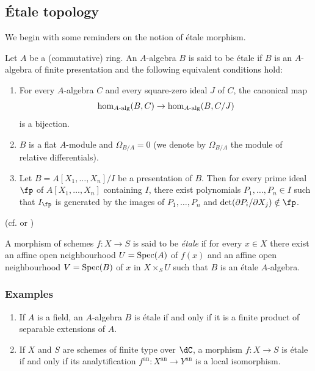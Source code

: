 \subsection{\'Etale topology}\label{I:2-1}

We begin with some reminders on the notion of \'etale morphism. 

\begin{definition}\label{I:2-1-1}
Let $A$ be a (commutative) ring. An $A$-algebra $B$ is said to be \'etale if 
$B$ is an $A$-algebra of finite presentation and the following 
equivalent conditions hold:
\begin{enumerate}[\indent a)]
  \item For every $A$-algebra $C$ and every square-zero ideal $J$ of 
    $C$, the canonical map 
    \[
      \hom_{A\textnormal{-alg}}(B,C) \to \hom_{A\textnormal{-alg}}(B,C/J)
    \]
    is a bijection.
  \item $B$ is a flat $A$-module and $\Omega_{B/A}=0$ (we denote by $\Omega_{B/A}$ 
    the module of relative differentials).
  \item Let $B=A[X_1,\dotsc,X_n]/I$ be a presentation of $B$. Then for every 
    prime ideal $\fp$ of $A[X_1,\dotsc,X_n]$ containing $I$, there exist 
    polynomials $P_1,\dotsc,P_n\in I$ such that $I_\fp$ is generated by the 
    images of $P_1,\dotsc,P_n$ and $\det(\partial P_i/\partial X_j)\notin \fp$.  
\end{enumerate}
\end{definition}
(cf. \cite[I]{sga1} or \cite[V]{ra70})

A morphism of schemes $f:X\to S$ is said to be \emph{\'etale} if for every 
$x\in X$ there exist an affine open neighbourhood $U=\operatorname{Spec}(A)$ of $f(x)$ and an 
affine open neighbourhood $V=\operatorname{Spec}(B)$ of $x$ in $X\times_S U$ such that $B$ is 
an \'etale $A$-algebra. 





\subsubsection{Examples}\label{I:2-1-2}
\begin{enumerate}[\indent a)]
  \item If $A$ is a field, an $A$-algebra $B$ is \'etale if and only if 
    it is a finite product of separable extensions of $A$. 
  \item If $X$ and $S$ are schemes of finite type over $\dC$, a morphism 
    $f:X\to S$ is \'etale if and only if its analytification 
    $f^{\text{an}}:X^{\text{an}}\to Y^{\text{an}}$ is a local isomorphism.
\end{enumerate}





